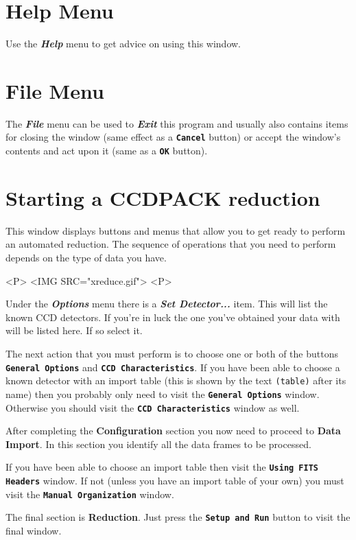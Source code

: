 \documentclass[11pt]{article}
\newcommand{\xlabel}[1]{}
\newcommand{\butt}[1]{{\bf \tt #1}}
\newcommand{\menu}[1]{{\bf \em #1}}
\newcommand{\wlab}[1]{{\bf #1}}
\newcommand{\text}[1]{{\tt #1}}
\begin{document}
\section{Help Menu \xlabel{OnHelp}}
Use the \menu{Help} menu to get advice on using this window.

\section{File Menu \xlabel{OnFile}}
The \menu{File} menu can be used to \menu{Exit} this program and
usually also contains items for closing the window (same effect as a
\butt{Cancel} button) or accept the window's contents and act
upon it (same as a \butt{OK} button).

\section{Starting a CCDPACK reduction \xlabel{CCDMainWindow}}
This window displays buttons and menus that allow you to get
ready to perform an automated reduction. The sequence of operations
that you need to perform depends on the type of data you have.

\begin{rawhtml}
<P>
<IMG SRC="xreduce.gif">
<P>
\end{rawhtml}

Under the \menu{Options} menu there is a \menu{Set Detector...}
item. This will list the known CCD detectors. If you're in luck the
one you've obtained your data with will be listed here. If so select it.

The next action that you must perform is to choose one or both of the
buttons \butt{General Options} and \butt{CCD Characteristics}. If you
have been able to choose a known detector with an import table (this
is shown by the text \text{(table)} after its name) then you probably
only need to visit the \butt{General Options} window. Otherwise you
should visit the \butt{CCD Characteristics} window as well.

After completing the \wlab{Configuration} section you now need to
proceed to \wlab{Data Import}. In this section you identify all the
data frames to be processed.

If you have been able to choose an import table then visit the
\butt{Using FITS Headers} window. If not (unless you have an import
table of your own) you must visit the \butt{Manual Organization}
window.

The final section is \wlab{Reduction}. Just press the \butt{Setup and
Run} button to visit the final window.
\end{document}
